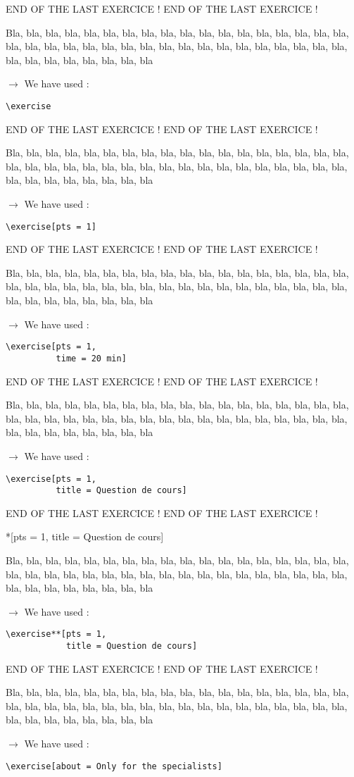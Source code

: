 \documentclass[12pt]{article}
\newcommand\blabla{%
		\noindent%
		Bla, bla, bla, bla, bla, bla, bla, bla, bla, bla, bla,
		bla, bla, bla, bla, bla, bla, bla, bla, bla, bla, bla,
		bla, bla, bla, bla, bla, bla, bla, bla, bla, bla, bla,
		bla, bla, bla, bla, bla, bla, bla, bla, bla, bla, bla
	}
\newcommand\codeused{%
		\blabla{} \medskip  \par
		\noindent $\rightarrow$ We have used :
	}
\begin{document}
\newpage \medskip \noindent END OF THE LAST EXERCICE ! END OF THE LAST EXERCICE !

\exercise

\codeused{}
\begin{verbatim}
\exercise
\end{verbatim}



\newpage \medskip \noindent END OF THE LAST EXERCICE ! END OF THE LAST EXERCICE !

\exercise[pts = 1]

\codeused{}
\begin{verbatim}
\exercise[pts = 1]
\end{verbatim}



\newpage \medskip \noindent END OF THE LAST EXERCICE ! END OF THE LAST EXERCICE !

\exercise[pts = 1, time = 20 min]

\codeused{}
\begin{verbatim}
\exercise[pts = 1,
          time = 20 min]
\end{verbatim}



\newpage \medskip \noindent END OF THE LAST EXERCICE ! END OF THE LAST EXERCICE !

\exercise[pts = 1,
          title = Question de cours]

\codeused{}
\begin{verbatim}
\exercise[pts = 1,
          title = Question de cours]
\end{verbatim}



\newpage \medskip \noindent END OF THE LAST EXERCICE ! END OF THE LAST EXERCICE !

\exercise**[pts = 1,
           title = Question de cours]

\codeused{}
\begin{verbatim}
\exercise**[pts = 1,
            title = Question de cours]
\end{verbatim}



\newpage \medskip \noindent END OF THE LAST EXERCICE ! END OF THE LAST EXERCICE !

\exercise[about = Only for the specialists]

\codeused{}
\begin{verbatim}
\exercise[about = Only for the specialists]
\end{verbatim}
\end{document}
